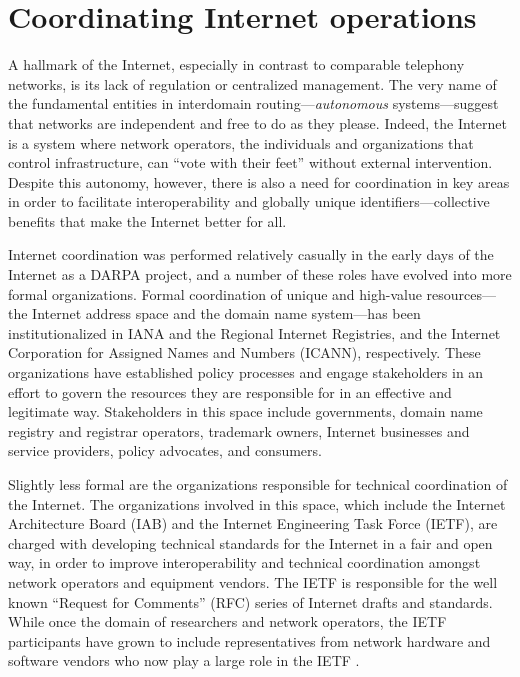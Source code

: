 \section{Coordinating Internet operations}

A hallmark of the Internet, especially in contrast to comparable telephony
networks, is its lack of regulation or centralized management. The very name of
the fundamental entities in interdomain routing---\emph{autonomous}
systems---suggest that networks are independent and free to do as they please.
Indeed, the Internet is a system where network operators, the individuals and
organizations that control infrastructure, can ``vote with their feet'' without
external intervention. Despite this autonomy, however, there is also a need for
coordination in key areas in order to facilitate interoperability and globally
unique identifiers---collective benefits that make the Internet better for
all.

Internet coordination was performed relatively casually in the early days of
the Internet as a DARPA project, and a number of these roles have evolved into
more formal organizations. Formal coordination of unique and high-value
resources---the Internet address space and the domain name system---has been
institutionalized in IANA and the Regional Internet Registries, and the
Internet Corporation for Assigned Names and Numbers (ICANN), respectively.
These organizations have established policy processes and engage stakeholders
in an effort to govern the resources they are responsible for in an effective
and legitimate way. Stakeholders in this space include governments, domain name
registry and registrar operators, trademark owners, Internet businesses and
service providers, policy advocates, and consumers.

Slightly less formal are the organizations responsible for technical
coordination of the Internet. The organizations involved in this space, which
include the Internet Architecture Board (IAB) and the Internet Engineering Task
Force (IETF), are charged with developing technical standards for the Internet
in a fair and open way, in order to improve interoperability and technical
coordination amongst network operators and equipment vendors. The IETF is
responsible for the well known ``Request for Comments'' (RFC) series of Internet
drafts and standards. While once the domain of researchers and network
operators, the IETF participants have grown to include representatives from
network hardware and software vendors who now play a large role in the IETF
\cite{Li:2011vn}.

